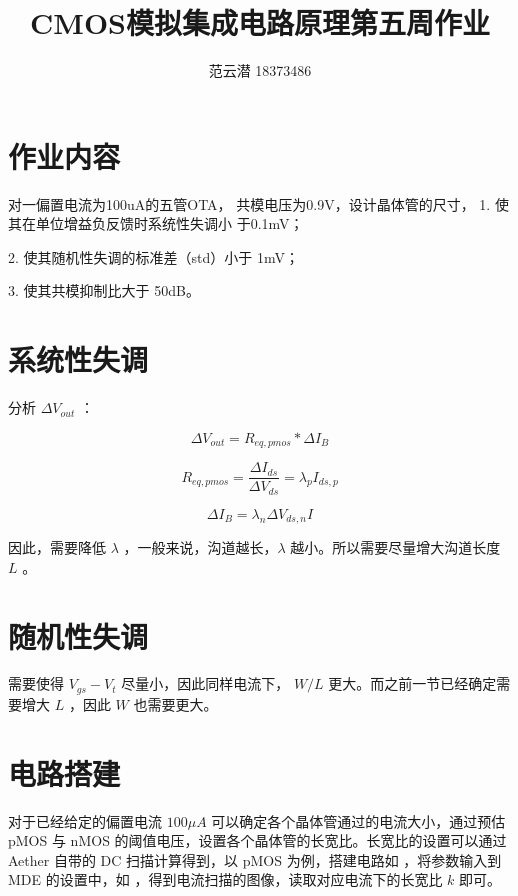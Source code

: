 \documentclass[lang=cn,11pt,a4paper,cite=authoryear]{elegantpaper}
\title{CMOS模拟集成电路原理\quad 第五周作业}
\author{范云潜 18373486}
\institute{微电子学院 184111 班}
\date{\zhtoday}
\begin{document}
\maketitle


\tableofcontents

\listoffigures

\section{作业内容}

对一偏置电流为100uA的五管OTA，
共模电压为0.9V，设计晶体管的尺寸，
1. 使其在单位增益负反馈时系统性失调小
于0.1mV；

2. 使其随机性失调的标准差（std）小于
1mV；

3. 使其共模抑制比大于 50dB。




\section{系统性失调}

分析 \(\Delta V_{out}\) ：

\[\Delta V_{out} = R_{eq, pmos} * \Delta I_B \]

\[R_{eq, pmos} = \frac{\Delta I_{ds}}{\Delta V_{ds}} = \lambda_p I_{ds, p}\]

\[\Delta I_B = \lambda_n \Delta V_{ds, n} I\]

因此，需要降低 \(\lambda\) ，一般来说，沟道越长，\(\lambda\) 越小。所以需要尽量增大沟道长度 \(L\) 。


\section{随机性失调}

需要使得 \(V_{gs}-V_t\) 尽量小，因此同样电流下， \(W/L\) 更大。而之前一节已经确定需要增大 \(L\) ，因此 \(W\) 也需要更大。

\section{电路搭建}

对于已经给定的偏置电流 \(100 \mu A\) 可以确定各个晶体管通过的电流大小，通过预估 pMOS 与 nMOS 的阈值电压，设置各个晶体管的长宽比。长宽比的设置可以通过 Aether 自带的 DC 扫描计算得到，以 pMOS 为例，搭建电路如  ，将参数输入到 MDE 的设置中，如 ，得到电流扫描的图像，读取对应电流下的长宽比 \(k\) 即可。
\end{document}
